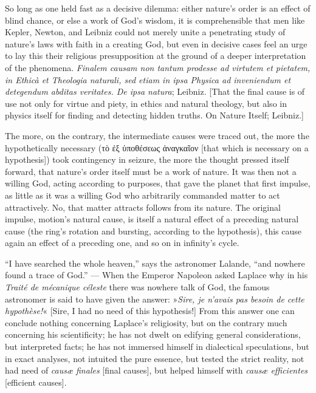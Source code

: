 \documentclass[12pt]{book}
\begin{document}
So long as one held fast as a decisive dilemma: either nature's order is an effect of blind chance, or else
a work of God's wisdom, it is comprehensible that men like Kepler, Newton, and Leibniz could not merely
unite a penetrating study of nature's laws with faith in a creating God, but even in decisive cases feel an
urge to lay this their religious presupposition at the ground of a deeper interpretation of the phenomena.
\textit{Finalem causam non tantum prodesse ad virtutem et pietatem, in Ethicà et Theologia naturali, sed
etiam in ipsa Physica ad inveniendum et detegendum abditas veritates. De ipsa natura}; Leibniz. [That the
final cause is of use not only for virtue and piety, in ethics and natural theology, but also in physics
itself for finding and detecting hidden truths. On Nature Itself; Leibniz.]

The more, on the contrary, the intermediate causes were traced out, the more the hypothetically necessary
(τὸ ἐξ ὑποθέσεως ἀναγκαῖον [that which is necessary on a hypothesis]) took contingency in seizure, the more
the thought pressed itself forward, that nature's order itself must be a work of nature.
It was then not a willing God, acting according to purposes, that gave the planet that first impulse, as
little as it was a willing God who arbitrarily commanded matter to act attractively. No, that matter
attracts follows from its nature. The original impulse, motion's natural cause, is itself a natural effect
of a preceding natural cause (the ring's rotation and bursting, according to the hypothesis), this cause
again an effect of a preceding one, and so on in infinity's cycle.

``I have searched the whole heaven,'' says the astronomer Lalande, ``and nowhere found a trace of God.'' ---
When the Emperor Napoleon asked Laplace why in his \textit{Traité de mécanique céleste} there was nowhere
talk of God, the famous astronomer is said to have given the answer: »\textit{Sire, je n'avais pas besoin de
cette hypothèse!}« [Sire, I had no need of this hypothesis!] From this answer one can conclude nothing
concerning Laplace's religiosity, but on the contrary much concerning his scientificity; he has not dwelt on
edifying general considerations, but interpreted facts; he has not immersed himself in dialectical
speculations, but in exact analyses, not intuited the pure essence, but tested the strict reality, not had
need of \textit{causæ finales} [final causes], but helped himself with \textit{causæ efficientes} [efficient
causes].
\end{document}
